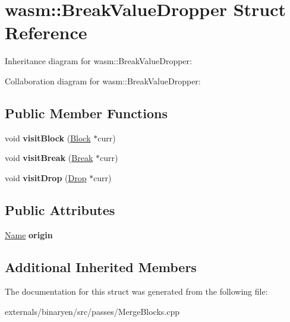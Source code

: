 \hypertarget{structwasm_1_1_break_value_dropper}{}\section{wasm\+:\+:Break\+Value\+Dropper Struct Reference}
\label{structwasm_1_1_break_value_dropper}


Inheritance diagram for wasm\+:\+:Break\+Value\+Dropper\+:


Collaboration diagram for wasm\+:\+:Break\+Value\+Dropper\+:
\subsection*{Public Member Functions}
\begin{DoxyCompactItemize}
\item 
\mbox{\label{structwasm_1_1_break_value_dropper_a78666c996b6ec5c1d15fb9939ddc3158}} 
void {\bfseries visit\+Block} (\mbox{\hyperlink{classwasm_1_1_block}{Block}} $\ast$curr)
\item 
\mbox{\label{structwasm_1_1_break_value_dropper_aef4693d3c379b1075fd9aa3962a675ef}} 
void {\bfseries visit\+Break} (\mbox{\hyperlink{classwasm_1_1_break}{Break}} $\ast$curr)
\item 
\mbox{\label{structwasm_1_1_break_value_dropper_a6c0784639298848df6c50f65592cf1fc}} 
void {\bfseries visit\+Drop} (\mbox{\hyperlink{classwasm_1_1_drop}{Drop}} $\ast$curr)
\end{DoxyCompactItemize}
\subsection*{Public Attributes}
\begin{DoxyCompactItemize}
\item 
\mbox{\label{structwasm_1_1_break_value_dropper_a921a7789e5467d875c9329da0259a5da}} 
\mbox{\hyperlink{structwasm_1_1_name}{Name}} {\bfseries origin}
\end{DoxyCompactItemize}
\subsection*{Additional Inherited Members}


The documentation for this struct was generated from the following file\+:\begin{DoxyCompactItemize}
\item 
externals/binaryen/src/passes/Merge\+Blocks.\+cpp\end{DoxyCompactItemize}
